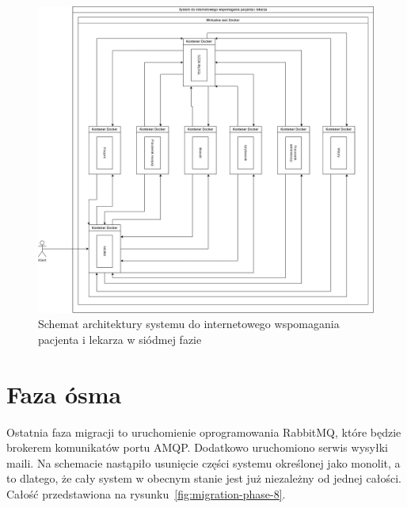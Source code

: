 \documentclass[12pt,twoside]{book}
\newcommand{\captionvspace}{\vspace{6pt}}
\begin{document}
    \begin{figure}[ht]
        \centering
        \includegraphics[width=\textwidth]{includes/images/migration-phase-7.png}
        \captionvspace
        \caption{Schemat architektury systemu do internetowego wspomagania pacjenta i lekarza w siódmej fazie}
        \label{fig:migration-phase-7}
    \end{figure}


    \section{Faza ósma}
    Ostatnia faza migracji to uruchomienie oprogramowania RabbitMQ, które będzie brokerem komunikatów portu AMQP. Dodatkowo uruchomiono serwis wysyłki maili. Na schemacie nastąpiło usunięcie części systemu określonej jako monolit, a to dlatego, że cały system w obecnym stanie jest już niezależny od jednej całości. Całość przedstawiona na rysunku~\ref{fig:migration-phase-8}.
\end{document}
